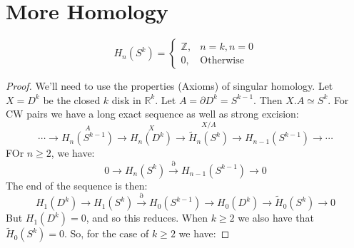 \documentclass{book}                                                           %
\begin{document}
        \section{More Homology}
            \begin{theorem}
                \begin{equation}
                    H_{n}(S^{k})=
                    \begin{cases}
                        \mathbb{Z},&n=k,n=0\\
                        0,&\textrm{Otherwise}
                    \end{cases}
                \end{equation}
            \end{theorem}
            \begin{proof}
                We'll need to use the properties (Axioms) of singular
                homology. Let $X=D^{k}$ be the closed $k$ disk in
                $\mathbb{R}^{k}$. Let $A=\partial{D}^{k}=S^{k-1}$. Then
                $X.A\simeq{S}^{k}$. For CW pairs we have a long exact sequence
                as well as strong excision:
                \begin{equation}
                    \cdots\longrightarrow
                    \overset{A}{H_{n}(S^{k-1})}\longrightarrow
                    \overset{X}{H_{n}(D^{k})}\longrightarrow
                    \overset{X/A}{\tilde{H}_{n}(S^{k})}\longrightarrow
                    H_{n-1}(S^{k-1})\longrightarrow\cdots
                \end{equation}
                FOr $n\geq{2}$, we have:
                \begin{equation}
                    0\longrightarrow{H}_{n}(S^{k})
                    \overset{\partial}{\longrightarrow}H_{n-1}(S^{k-1})
                    \longrightarrow{0}
                \end{equation}
                The end of the sequence is then:
                \begin{equation}
                    H_{1}(D^{k})\longrightarrow
                    H_{1}(S^{k})\overset{\partial}{\longrightarrow}
                    H_{0}(S^{k-1})\longrightarrow{H}_{0}(D^{k})
                    \longrightarrow\tilde{H}_{0}(S^{k})\longrightarrow{0}
                \end{equation}
                But $H_{1}(D^{k})=0$, and so this reduces. When $k\geq{2}$
                we also have that $\tilde{H}_{0}(S^{k})=0$. So, for the case
                of $k\geq{2}$ we have:

\end{proof}
\end{document}
